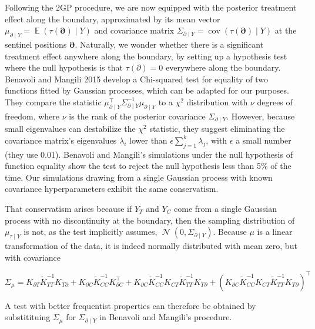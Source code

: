 \documentclass[letter]{article}
\newcommand{\genericdel}[3]{%
      \left#1#3\right#2
    }
\newcommand{\del}[1]{\genericdel(){#1}}
\DeclareMathOperator{\E}{\mathbb{E}}
\DeclareMathOperator{\cov}{{cov}}
\DeclareMathOperator{\normal}{\mathcal{N}}
\newcommand{\trans}{^{\intercal}}
\newcommand{\boundary}{\partial}
\newcommand{\sentinels}{\bm{\boundary}}
\begin{document}
Following the 2GP procedure, we are now equipped with the posterior
treatment effect along the boundary, approximated by its mean vector
\(\mu_{\boundary \mid Y} = \E \del{\tau(\sentinels) \mid Y}\) and
covariance matrix
\(\Sigma_{\boundary \mid Y} = \cov \del{\tau(\sentinels) \mid Y}\) at
the sentinel positions \(\sentinels\). Naturally, we wonder whether
there is a significant treatment effect anywhere along the boundary, by
setting up a hypothesis test where the null hypothesis is that
\(\tau(\boundary)=0\) everywhere along the boundary. Benavoli and
Mangili 2015 develop a Chi-squared test for equality of two functions
fitted by Gaussian processes, which can be adapted for our purposes.
They compare the statistic
\(\mu_{\boundary \mid Y}\trans \Sigma_{\boundary \mid Y}^{-1} \mu_{\boundary \mid Y}\)
to a \(\chi^2\) distribution with \(\nu\) degrees of freedom, where
\(\nu\) is the rank of the posterior covariance
\(\Sigma_{\boundary \mid Y}\). However, because small eigenvalues can
destabilize the \(\chi^2\) statistic, they suggest eliminating the
covariance matrix's eigenvalues \(\lambda_i\) lower than
\(\epsilon \sum_{j=1}^k \lambda_j\), with \(\epsilon\) a small number
(they use 0.01). Benavoli and Mangili's simulations under the null
hypothesis of function equality show the test to reject the null
hypothesis less than 5\% of the time. Our simulations drawing from a
single Gaussian process with known covariance hyperparameters exhibit
the same conservatism.

That conservatism arises because if \(Y_T\) and \(Y_C\) come from a
single Gaussian process with no discontinuity at the boundary, then the
sampling distribution of \(\mu_{\tau \mid Y}\) is not, as the test
implicitly assumes, \(\normal\del{0, \Sigma_{\boundary \mid Y}}\).
Because \(\mu\) is a linear transformation of the data, it is indeed
normally distributed with mean zero, but with covariance

\begin{equation}
    \Sigma_\mu = K_{\boundary T} \tilde{K}^{-1}_{TT} K_{T \boundary} + K_{\boundary C} \tilde{K}^{-1}_{CC} K\trans_{\boundary C} + K_{\boundary C} \tilde{K}^{-1}_{CC} K_{CT} \tilde{K}^{-1}_{TT} K_{T \boundary} + \del{K_{\boundary C} \tilde{K}^{-1}_{CC} K_{CT} \tilde{K}^{-1}_{TT} K_{T \boundary}}\trans
\end{equation}

A test with better frequentist properties can therefore be obtained by
substitituing \(\Sigma_\mu\) for \(\Sigma_{\boundary \mid Y}\) in
Benavoli and Mangili's procedure.
    
\end{document}
